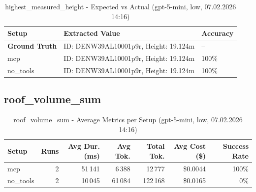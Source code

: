 \documentclass[a4paper,11pt]{article}
\begin{document}
\begin{table}[H]
\centering
\scriptsize
\caption{highest\_measured\_height - Detailed Runs Comparison (gpt-5-mini, low, 07.02.2026 14:16)}
\end{table}

\begin{table}[H]
\centering
\scriptsize
\caption{highest\_measured\_height - Expected vs Actual (gpt-5-mini, low, 07.02.2026 14:16)}
\begin{tabular}{l l l}
\toprule
Setup & Extracted Value & Accuracy \\
\midrule
\textbf{Ground Truth} & ID: DENW39AL10001p9r, Height: 19.124m & -- \\
\midrule
mcp & ID: DENW39AL10001p9r, Height: 19.124m & 100\% \\
no\_tools & ID: DENW39AL10001p9r, Height: 19.124m & 100\% \\
\bottomrule
\end{tabular}
\end{table}

\clearpage

\subsection{roof\_volume\_sum}

\begin{table}[H]
\centering
\scriptsize
\caption{roof\_volume\_sum - Average Metrics per Setup (gpt-5-mini, low, 07.02.2026 14:16)}
\label{tab:combined\_roof\_volume\_sum\_metrics\_20260207}
\begin{tabular}{l r r r r r r}
\toprule
Setup & Runs & Avg Dur. (ms) & Avg Tok. & Total Tok. & Avg Cost (\$) & Success Rate \\
\midrule
mcp & 2 & 51\,141 & 6\,388 & 12\,777 & \$0.0044 & 100\% \\
no\_tools & 2 & 10\,045 & 61\,084 & 122\,168 & \$0.0165 & 0\% \\
\bottomrule
\end{tabular}
\end{table}
\end{document}
